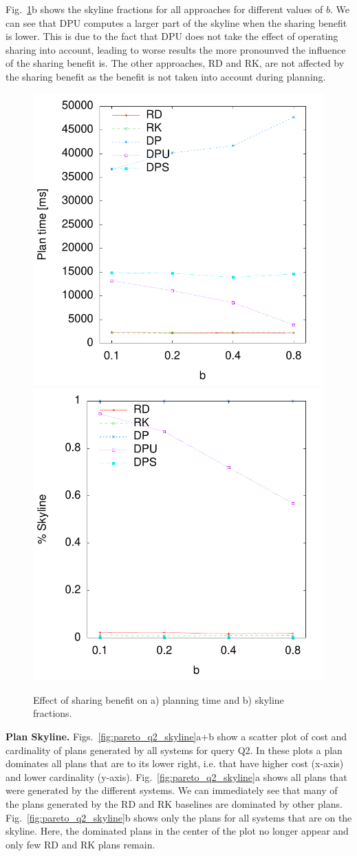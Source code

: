 Fig.~\ref{fig:pareto_sharing}b shows the skyline fractions for all
approaches for different values of $b$. We can see that DPU computes a
larger part of the skyline when the sharing benefit is lower. This is
due to the fact that DPU does not take the effect of operating sharing
into account, leading to worse results the more pronounved the
influence of the sharing benefit is. The other approaches, RD and RK,
are not affected by the sharing benefit as the benefit is not taken
into account during planning.

\begin{figure}[htb]
  \centering
  \includegraphics[width=0.49\linewidth]{figs/pareto_plan_b.pdf}
  \includegraphics[width=0.49\linewidth]{figs/plans_skyline_by_b.pdf}
  \caption{Effect of sharing benefit on a) planning time and b)
    skyline fractions.}
  \label{fig:pareto_sharing}
\end{figure}

\textbf{Plan Skyline.} Figs.~\ref{fig:pareto_q2_skyline}a+b show a scatter
plot of cost and cardinality of plans generated by all systems for
query Q2. In these plots a plan dominates all plans that are to its
lower right, i.e. that have higher cost (x-axis) and lower cardinality
(y-axis). Fig.~\ref{fig:pareto_q2_skyline}a shows all plans that were
generated by the different systems. We can immediately see that many
of the plans generated by the RD and RK baselines are dominated by
other plans. Fig.~\ref{fig:pareto_q2_skyline}b shows only the plans
for all systems that are on the skyline. Here, the dominated plans in
the center of the plot no longer appear and only few RD and RK plans
remain.

